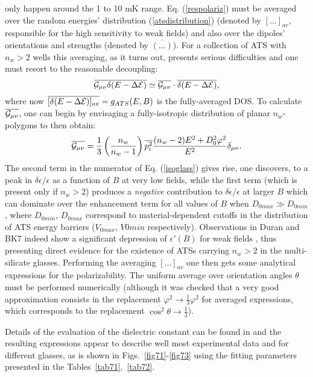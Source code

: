 \documentclass[10pt]{article}
\begin{document}
only happen around the 1 to 10 mK range. Eq. (\ref{respolariz}) must be averaged 
over the random energies' distribution (\ref{atsdistribution})
(denoted by $[\dots]_{av}$, responsible for the high sensitivity to weak fields) and
also over the dipoles' orientations and strengths (denoted by $\overline{(\dots)}$). 
For a collection of ATS with $n_w>2$ wells this averaging, as it turns out,  presents 
serious difficulties and one must resort to the reasonable decoupling:
\begin{equation}
\overline{{\cal G}_{\mu\nu}\delta(E-\Delta{\cal E})}\simeq
\overline{{\cal G}_{\mu\nu}}\cdot\overline{\delta(E-\Delta{\cal E})},
\label{decoupl}
\end{equation}
where now $\overline{[\delta(E-\Delta{\cal E})]_{av}}=g_{ATS}(E,B)$ is the
fully-averaged DOS. To calculate $\overline{{\cal G}_{\mu\nu}}$, one can begin by
envisaging a fully-isotropic distribution of planar $n_w$-polygons to then obtain:
\begin{equation}
\overline{{\cal G}_{\mu\nu}}=\frac{1}{3}\left ( \frac{n_w}{n_w-1} \right )
\overline{p_i^2}\frac{(n_w-2)E^2+D_0^2\varphi^2}{E^2}\delta_{\mu\nu}.
\label{isoglass}
\end{equation}
The second term in the numerator of Eq. (\ref{isoglass}) gives rise, one discovers, 
to a peak in $\delta\epsilon/\epsilon$ as a function of $B$ at very low fields, while 
the first term (which is present only if $n_w>2$) produces a {\it negative} 
contribution to $\delta\epsilon/\epsilon$ at larger $B$ which can dominate over 
the enhancement term for all values of $B$ when $D_{0max}\gg D_{0min}$, 
where $D_{0min}$, $D_{0max}$ correspond to material-dependent cutoffs in 
the distribution of ATS energy barriers ($V_{0max}$, $V{0min}$ respectively).
Observations in Duran and BK7 indeed show a significant depression of
$\epsilon'(B)$ for weak fields \cite{Woh2001}, thus presenting direct evidence for
the existence of ATSs carrying $n_w>2$ in the multi-silicate glasses. Performing
the averaging $[\dots]_{av}$ one then gets some analytical expressions for the
polarizability. The uniform average over orientation angles $\theta$ must be
performed numerically (although it was checked that a very good approximation 
consists in the replacement $\varphi^2 \to \frac{1}{3}\varphi^2$ for averaged 
expressions, which corresponds to the replacement 
$\overline{\cos^2\theta}\to\frac{1}{3}$).

Details of the evaluation of the dielectric constant can be found in \cite{JBK2016} 
and the resulting expressions appear to describe well most experimental data and 
for different glasses, as is shown in Figs.~\ref{fig71}-\ref{fig73} using the fitting 
parameters presented in the Tables~\ref{tab71},~\ref{tab72}.
\end{document}
